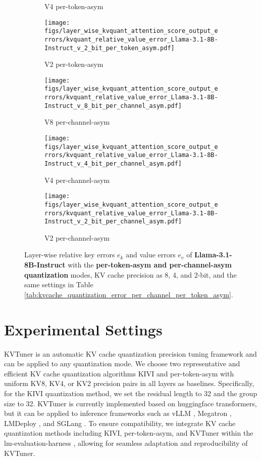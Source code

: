 \begin{figure}
\begin{subfigure}{0.25\columnwidth}
    \caption{V4 per-token-asym}
    \end{subfigure}
    \begin{subfigure}{0.25\columnwidth}
    \texttt{[image: figs/layer\_wise\_kvquant\_attention\_score\_output\_errors/kvquant\_relative\_value\_error\_Llama-3.1-8B-Instruct\_v\_2\_bit\_per\_token\_asym.pdf]}
    \caption{V2 per-token-asym}
    \end{subfigure}
    \begin{subfigure}{0.25\columnwidth}
    \texttt{[image: figs/layer\_wise\_kvquant\_attention\_score\_output\_errors/kvquant\_relative\_value\_error\_Llama-3.1-8B-Instruct\_v\_8\_bit\_per\_channel\_asym.pdf]}
    \caption{V8 per-channel-asym}
    \end{subfigure}
    \begin{subfigure}{0.25\columnwidth}
    \texttt{[image: figs/layer\_wise\_kvquant\_attention\_score\_output\_errors/kvquant\_relative\_value\_error\_Llama-3.1-8B-Instruct\_v\_4\_bit\_per\_channel\_asym.pdf]}
    \caption{V4 per-channel-asym}
    \end{subfigure}
    \begin{subfigure}{0.25\columnwidth}
    \texttt{[image: figs/layer\_wise\_kvquant\_attention\_score\_output\_errors/kvquant\_relative\_value\_error\_Llama-3.1-8B-Instruct\_v\_2\_bit\_per\_channel\_asym.pdf]}
    \caption{V2 per-channel-asym}
    \end{subfigure}
    \caption{Layer-wise relative key errors $e_k$ and value errors $e_v$ of \textbf{Llama-3.1-8B-Instruct} with the \textbf{per-token-asym and per-channel-asym quantization} modes, KV cache precision as 8, 4, and 2-bit, and the same settings in Table \ref{tab:kvcache_quantization_error_per_channel_per_token_asym}.}
    \label{fig:layer_wise_relative_key_value_quantization_error_Llama-3.1-8B-Instruct_gsm8k}
\end{figure}

\section{Experimental Settings}
\label{sec:experimental_settings}
KVTuner is an automatic KV cache quantization precision tuning framework and can be applied to any quantization mode. We choose two representative and efficient KV cache quantization algorithms KIVI \cite{liu2024kivi} and per-token-asym with uniform KV8, KV4, or KV2 precision pairs in all layers as baselines. Specifically, for the KIVI quantization method, we set the residual length to 32 and the group size to 32.
KVTuner is currently implemented based on huggingface transformers, but it can be applied to inference frameworks such as vLLM \cite{kwon2023vllm}, Megatron \cite{shoeybi2019megatron}, LMDeploy \cite{2023lmdeploy}, and SGLang \cite{zheng2024sglang}. To ensure compatibility, we integrate KV cache quantization methods including KIVI, per-token-asym, and KVTuner within the lm-evaluation-harness \cite{eval-harness}, allowing for seamless adaptation and reproducibility of KVTuner.

